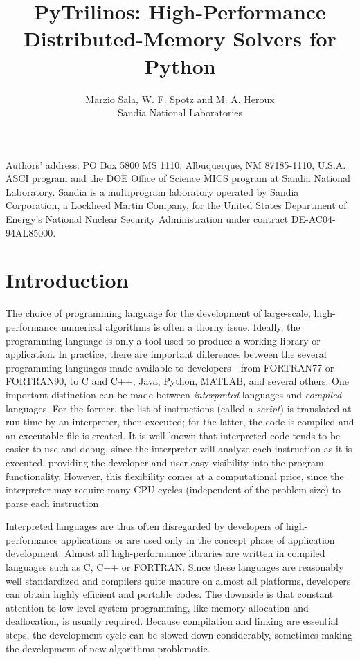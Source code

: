 \documentclass[acmtocl]{acmtrans2m}
\title{PyTrilinos: High-Performance Distributed-Memory Solvers for
       Python}
\author{Marzio Sala, W. F. Spotz and M. A. Heroux \\
        Sandia National Laboratories}
\begin{document}
\setcounter{page}{1}

\begin{bottomstuff}
Authors' address: PO Box 5800 MS 1110, Albuquerque, NM 87185-1110,
U.S.A.\newline
ASCI program and the DOE Office of Science MICS program at Sandia
National Laboratory.  Sandia is a multiprogram laboratory operated by
Sandia Corporation, a Lockheed Martin Company, for the United States
Department of Energy's National Nuclear Security Administration under
contract DE-AC04-94AL85000.
\end{bottomstuff}

\maketitle

\section{Introduction}
\label{sec:intro}

The choice of programming language for the development of
large-scale, high-performance numerical algorithms is often a thorny
issue. Ideally, the programming language is only a tool used to
produce a working library or application.  In practice, there are
important differences between the several programming languages made
available to developers---from FORTRAN77 or FORTRAN90, to C and C++,
Java, Python, MATLAB, and several others.  One important distinction
can be made between {\sl interpreted} languages and {\sl compiled}
languages. For the former, the list of instructions (called a {\sl
script}) is translated at run-time by an interpreter, then executed;
for the latter, the code is compiled and an executable file is
created. It is well known that interpreted code tends to be easier
to use and debug, since the interpreter will analyze each
instruction as it is executed, providing the developer and user easy
visibility into the program functionality. However, this flexibility
comes at a computational price, since the interpreter may require
many CPU cycles (independent of the problem size) to parse each
instruction.

Interpreted languages are thus often disregarded by developers of
high-performance applications or are used only in the concept phase
of application development.  Almost all high-performance libraries
are written in compiled languages such as C, C++ or FORTRAN.  Since
these languages are reasonably well standardized and compilers quite
mature on almost all platforms, developers can obtain highly
efficient and portable codes.  The downside is that constant
attention to low-level system programming, like memory allocation
and deallocation, is usually required.  Because compilation and
linking are essential steps, the development cycle can be slowed
down considerably, sometimes making the development of new
algorithms problematic.
\end{document}
